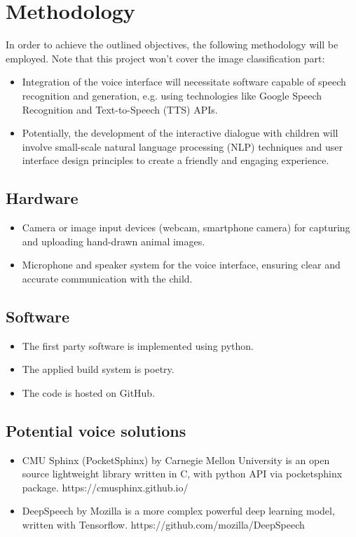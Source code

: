 \section{Methodology}
In order to achieve the outlined objectives, the following methodology will be employed. Note that this project won't cover the image classification part:
\begin{itemize}
  \item Integration of the voice interface will necessitate software capable of speech recognition and generation, e.g. using technologies like Google Speech Recognition and Text-to-Speech (TTS) APIs.
  \item Potentially, the development of the interactive dialogue with children will involve small-scale natural language processing (NLP) techniques and user interface design principles to create a friendly and engaging experience.
\end{itemize}
\subsection{Hardware}
\begin{itemize}
  \item Camera or image input devices (webcam, smartphone camera) for capturing and uploading hand-drawn animal images.
  \item Microphone and speaker system for the voice interface, ensuring clear and accurate communication with the child.
\end{itemize}
\subsection{Software}
\begin{itemize}
  \item The first party software is implemented using python.
  \item The applied build system is poetry.
  \item The code is hosted on GitHub.
\end{itemize}
\subsection{Potential voice solutions}
\begin{itemize}
  \item CMU Sphinx (PocketSphinx) by Carnegie Mellon University is an open source lightweight library written in C, with python API via pocketsphinx package. https://cmusphinx.github.io/
  \item DeepSpeech by Mozilla is a more complex powerful deep learning model, written with Tensorflow. https://github.com/mozilla/DeepSpeech
\end{itemize}

